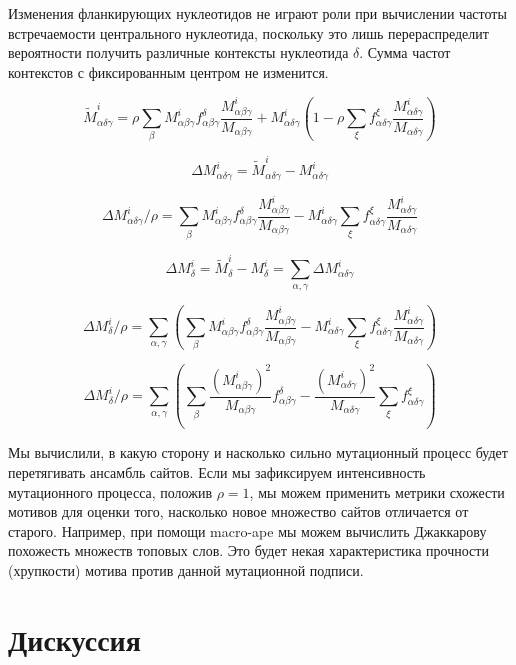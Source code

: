 \documentclass[a4paper]{article}
\begin{document}
Изменения фланкирующих нуклеотидов не играют роли при вычислении частоты встречаемости центрального нуклеотида, поскольку это лишь перераспределит вероятности получить различные контексты нуклеотида $\delta$. Сумма частот контекстов с фиксированным центром не изменится.

$$\widetilde{M}^i_{\alpha\delta\gamma} = \rho\sum_{\beta}M^i_{\alpha\beta\gamma}f_{\alpha\beta\gamma}^{\delta}\frac{M^i_{\alpha\beta\gamma}}{M_{\alpha\beta\gamma}} + M^i_{\alpha\delta\gamma}\left(1 - \rho\sum_{\xi}f_{\alpha\delta\gamma}^{\xi}\frac{M^i_{\alpha\delta\gamma}}{M_{\alpha\delta\gamma}}\right)$$

$$\Delta M^i_{\alpha\delta\gamma} = \widetilde{M}^i_{\alpha\delta\gamma} - M^i_{\alpha\delta\gamma}$$

$$\Delta M^i_{\alpha\delta\gamma}/\rho = \sum_{\beta}M^i_{\alpha\beta\gamma}f_{\alpha\beta\gamma}^{\delta}\frac{M^i_{\alpha\beta\gamma}}{M_{\alpha\beta\gamma}} - M^i_{\alpha\delta\gamma}\sum_{\xi}f_{\alpha\delta\gamma}^{\xi}\frac{M^i_{\alpha\delta\gamma}}{M_{\alpha\delta\gamma}}$$

$$\Delta M^i_{\delta} = \widetilde{M}^i_{\delta} - M^i_{\delta} = \sum_{\alpha,\gamma}\Delta M^i_{\alpha\delta\gamma}$$

$$\Delta M^i_{\delta}/\rho = \sum_{\alpha,\gamma}\left(\sum_{\beta}M^i_{\alpha\beta\gamma}f_{\alpha\beta\gamma}^{\delta}\frac{M^i_{\alpha\beta\gamma}}{M_{\alpha\beta\gamma}} - M^i_{\alpha\delta\gamma}\sum_{\xi}f_{\alpha\delta\gamma}^{\xi}\frac{M^i_{\alpha\delta\gamma}}{M_{\alpha\delta\gamma}}\right)$$

$$\Delta M^i_{\delta}/\rho = \sum_{\alpha,\gamma}\left(\sum_{\beta}\frac{\left(M^i_{\alpha\beta\gamma}\right)^2}{M_{\alpha\beta\gamma}}f_{\alpha\beta\gamma}^{\delta} - \frac{\left(M^i_{\alpha\delta\gamma}\right)^2}{M_{\alpha\delta\gamma}}\sum_{\xi}f_{\alpha\delta\gamma}^{\xi}\right)$$


Мы вычислили, в какую сторону и насколько сильно мутационный процесс будет перетягивать ансамбль сайтов. Если мы зафиксируем интенсивность мутационного процесса, положив $\rho=1$, мы можем применить метрики схожести мотивов для оценки того, насколько новое множество сайтов отличается от старого. Например, при помощи macro-ape мы можем вычислить Джаккарову похожесть множеств топовых слов. Это будет некая характеристика прочности (хрупкости) мотива против данной мутационной подписи.

\section{Дискуссия}
\end{document}
